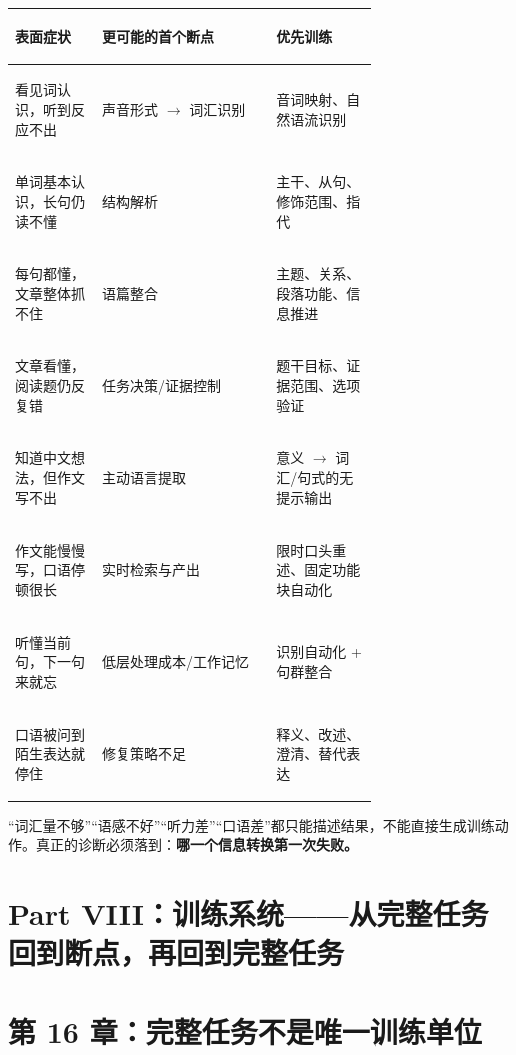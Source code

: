 \documentclass[11pt,a4paper]{ctexart}
\newcommand{\kw}[1]{\textbf{#1}}
\begin{document}
\begin{center}
\small
\begin{tabularx}{\linewidth}{>{\bfseries\raggedright\arraybackslash}p{0.24\linewidth} >{\raggedright\arraybackslash}p{0.48\linewidth} Y}
\toprule
表面症状 & 更可能的首个断点 & 优先训练 \\
\midrule
看见词认识，听到反应不出 & 声音形式 $\rightarrow$ 词汇识别 & 音词映射、自然语流识别 \\
单词基本认识，长句仍读不懂 & 结构解析 & 主干、从句、修饰范围、指代 \\
每句都懂，文章整体抓不住 & 语篇整合 & 主题、关系、段落功能、信息推进 \\
文章看懂，阅读题仍反复错 & 任务决策/证据控制 & 题干目标、证据范围、选项验证 \\
知道中文想法，但作文写不出 & 主动语言提取 & 意义 $\rightarrow$ 词汇/句式的无提示输出 \\
作文能慢慢写，口语停顿很长 & 实时检索与产出 & 限时口头重述、固定功能块自动化 \\
听懂当前句，下一句来就忘 & 低层处理成本/工作记忆 & 识别自动化 + 句群整合 \\
口语被问到陌生表达就停住 & 修复策略不足 & 释义、改述、澄清、替代表达 \\
\bottomrule
\end{tabularx}
\end{center}

\begin{warn}[禁止使用的粗诊断]
“词汇量不够”“语感不好”“听力差”“口语差”都只能描述结果，不能直接生成训练动作。真正的诊断必须落到：\kw{哪一个信息转换第一次失败。}
\end{warn}

\newpage
\section{Part VIII：训练系统——从完整任务回到断点，再回到完整任务}

\section{第 16 章：完整任务不是唯一训练单位}
\end{document}
